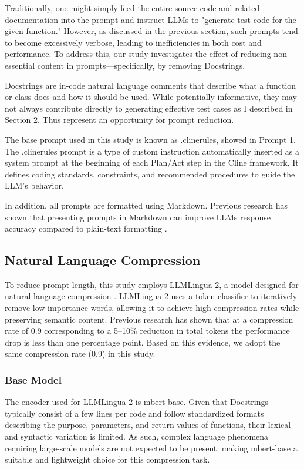 Traditionally, one might simply feed the entire source code and related documentation into the prompt and instruct LLMs to "generate test code for the given function." However, as discussed in the previous section, such prompts tend to become excessively verbose, leading to inefficiencies in both cost and performance. To address this, our study investigates the effect of reducing non-essential content in prompts—specifically, by removing Docstrings.

Docstrings are in-code natural language comments that describe what a function or class does and how it should be used. While potentially informative, they may not always contribute directly to generating effective test cases as I described in Section 2. Thus represent an opportunity for prompt reduction.

The base prompt used in this study is known as .clinerules, showed in Prompt 1. The .clinerules prompt is a type of custom instruction automatically inserted as a system prompt at the beginning of each Plan/Act step in the Cline framework. It defines coding standards, constraints, and recommended procedures to guide the LLM’s behavior.



In addition, all prompts are formatted using Markdown. Previous research has shown that presenting prompts in Markdown can improve LLMs response accuracy compared to plain-text formatting \cite{he2024doespromptformattingimpact}.

\subsection{Natural Language Compression}

To reduce prompt length, this study employs LLMLingua-2, a model designed for natural language compression \cite{pan2024llmlingua2datadistillationefficient}. LLMLingua-2 uses a token classifier to iteratively remove low-importance words, allowing it to achieve high compression rates while preserving semantic content. Previous research has shown that at a compression rate of 0.9 corresponding to a 5–10\% reduction in total tokens the performance drop is less than one percentage point. Based on this evidence, we adopt the same compression rate (0.9) in this study.

\subsubsection{Base Model}
The encoder used for LLMLingua-2 is mbert-base. Given that Docstrings typically consist of a few lines per code and follow standardized formats describing the purpose, parameters, and return values of functions, their lexical and syntactic variation is limited. As such, complex language phenomena requiring large-scale models are not expected to be present, making mbert-base a suitable and lightweight choice for this compression task.

